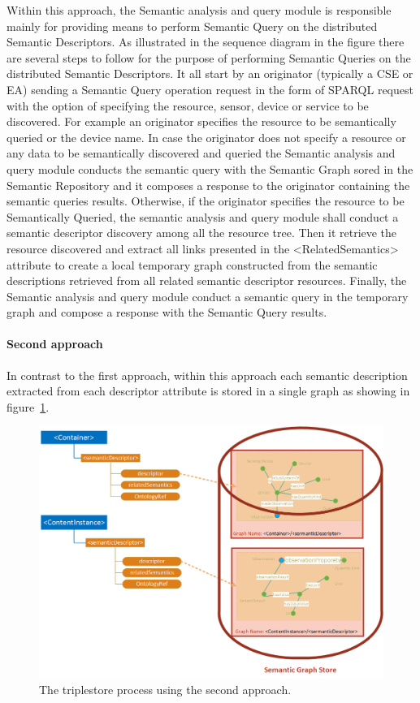 Within this approach, the Semantic analysis and query module is responsible mainly for providing means to perform Semantic Query on the distributed Semantic Descriptors. As illustrated in the sequence diagram in the figure there are several steps to follow for the purpose of performing Semantic Queries on the distributed Semantic Descriptors. It all start by an originator (typically a CSE or EA) sending a Semantic Query operation request in the form of SPARQL request with the option of specifying the resource, sensor, device or service to be discovered. For example an originator specifies the resource to be semantically queried or the device name. In case the originator does not specify a resource or any data to be semantically discovered and queried the Semantic analysis and query module conducts the semantic query with the Semantic Graph sored in the Semantic Repository and it composes a response to the originator containing the semantic queries results. Otherwise, if the originator specifies the resource to be Semantically Queried, the semantic analysis and query module shall conduct a semantic descriptor discovery among all the resource tree. Then it retrieve the resource discovered and extract all links presented in the <RelatedSemantics> attribute to create a local temporary graph constructed from the semantic descriptions retrieved from all related semantic descriptor resources. Finally, the Semantic analysis and query module conduct a semantic query in the temporary graph and compose a response with the Semantic Query results. 

  
\paragraph{Second approach }

In contrast to the first approach, within this approach each semantic description extracted from each descriptor attribute is stored in a single graph as showing in figure~\ref{fig:contrib2:2store}.
\begin{figure}[htbp]
    \centering
    \includegraphics[width=.9\textwidth]{resources/images/2store}
    \caption{The triplestore process using the second approach. }\label{fig:contrib2:2store}
\end{figure}

